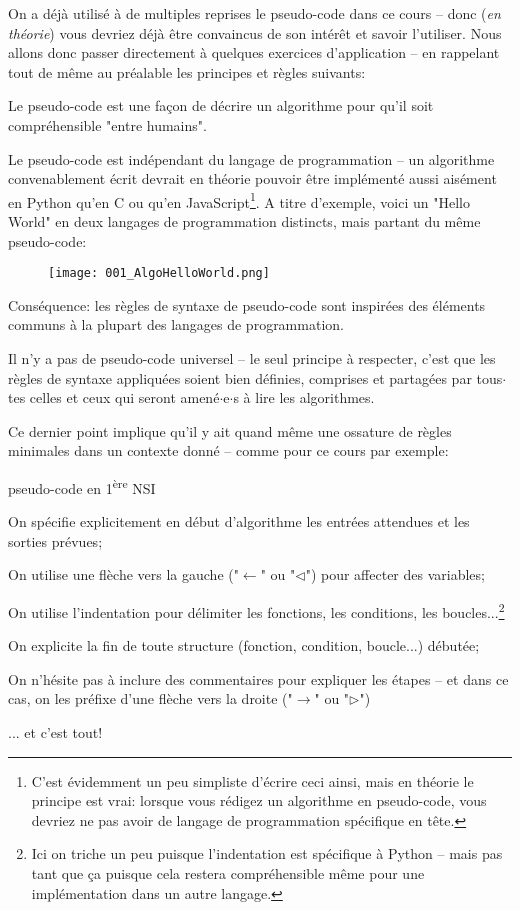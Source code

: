 \documentclass[12pt]{article}
\begin{document}
	On a déjà utilisé à de multiples reprises le pseudo-code dans ce cours -- donc (\textit{en théorie}) vous devriez déjà être convaincus de son intérêt et savoir l'utiliser. Nous allons donc passer directement à quelques exercices d'application -- en rappelant tout de même au préalable les principes et règles suivants:
	\begin{alphenum}
		\item Le pseudo-code est une façon de décrire un algorithme pour qu'il soit compréhensible "entre humains".
		\item Le pseudo-code est indépendant du langage de programmation -- un algorithme convenablement écrit devrait en théorie pouvoir être implémenté aussi aisément en Python qu'en C ou qu'en JavaScript\footnote{C'est évidemment un peu simpliste d'écrire ceci ainsi, mais en théorie le principe est vrai: lorsque vous rédigez un algorithme en pseudo-code, vous devriez ne pas avoir de langage de programmation spécifique en tête.}. A titre d'exemple, voici un "Hello World" en deux langages de programmation distincts, mais partant du même pseudo-code:
		\begin{figure}[H]
			\centering
			\texttt{[image: 001\_AlgoHelloWorld.png]}
		\end{figure}
		\item Conséquence: les règles de syntaxe de pseudo-code sont inspirées des éléments communs à la plupart des langages de programmation.
		\item Il n'y a pas de pseudo-code universel -- le seul principe à respecter, c'est que les règles de syntaxe appliquées soient bien définies, comprises et partagées par tous$\cdot$tes celles et ceux qui seront amené$\cdot$e$\cdot$s à lire les algorithmes.
	\end{alphenum}
	
	Ce dernier point implique qu'il y ait quand même une ossature de règles minimales dans un contexte donné -- comme pour ce cours par exemple:
	\begin{MaRgl}{pseudo-code en 1\textsuperscript{ère} NSI}
		\begin{alphenum}
			\item On spécifie explicitement en début d'algorithme les entrées attendues et les sorties prévues;
			\item On utilise une flèche vers la gauche ("$\leftarrow$" ou "$\lhd$") pour affecter des variables;
			\item On utilise l'indentation pour délimiter les fonctions, les conditions, les boucles...\footnote{Ici on triche un peu puisque l'indentation est spécifique à Python -- mais pas tant que ça puisque cela restera compréhensible même pour une implémentation dans un autre langage.}
			\item On explicite la fin de toute structure (fonction, condition, boucle...) débutée;
			\item On n'hésite pas à inclure des commentaires pour expliquer les étapes -- et dans ce cas, on les préfixe d'une flèche vers la droite ("$\rightarrow$" ou "$\rhd$")
			\item ... et c'est tout!
		\end{alphenum}
	\end{MaRgl}
	
\end{document}
